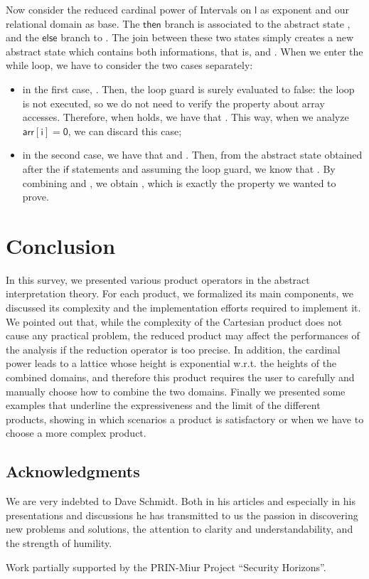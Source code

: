 \documentclass[submission,copyright,creativecommons]{eptcs}
\newcommand{\statement}[1]{\ensuremath{\mathsf{#1}}}
\begin{document}
Now consider the reduced cardinal power of Intervals on \statement{l} as exponent and our relational domain as base. The \statement{then} branch is associated to the abstract state , and the \statement{else} branch to . The join between these two states simply creates a new abstract state which contains both informations, that is,  and . When we enter the while loop, we have to consider the two cases separately:
\begin{itemize}
\item in the first case, . Then, the loop guard  is surely evaluated to false: the loop is not executed, so we do not need to verify the property about array accesses. Therefore, when  holds, we have that . This way, when we analyze \statement{arr[i]=0}, we can discard this case;
\item in the second case, we have that  and . Then, from the abstract state obtained after the \statement{if} statements and assuming the loop guard, we know that . By combining  and , we obtain , which is exactly the property we wanted to prove. 
\end{itemize}


\section{Conclusion}
In this survey, we presented various product operators in the abstract interpretation theory. 
For each product, we formalized its main components, we discussed its complexity and the implementation efforts required to implement it. We pointed out that, while the complexity of the Cartesian product does not cause any practical problem, the reduced product may affect the performances of the analysis if the reduction operator is too precise. In addition, the cardinal power leads to a lattice whose height is exponential w.r.t. the heights of the combined domains, and therefore this product requires the user to carefully and manually choose how to combine the two domains.
Finally we presented some examples that underline the expressiveness and the limit of the different products, showing in which scenarios a product is satisfactory or when we have to choose a more complex product.

\subsection*{Acknowledgments}
We are very indebted to Dave Schmidt. Both in his articles and especially in his presentations and discussions he has transmitted to us the passion in discovering new problems and solutions, the attention to clarity and understandability, and the strength of humility.

Work partially supported by the PRIN-Miur Project \textquotedblleft Security Horizons\textquotedblright .



\end{document}
